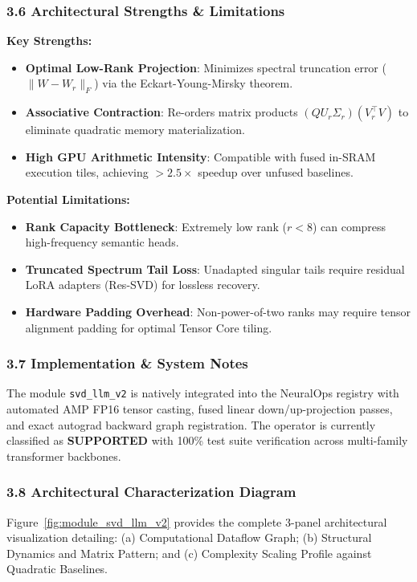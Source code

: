 \subsubsection*{3.6 Architectural Strengths \& Limitations}
\textbf{Key Strengths:}
\begin{itemize}
    \item \textbf{Optimal Low-Rank Projection}: Minimizes spectral truncation error ($\|W - W_r\|_F$) via the Eckart-Young-Mirsky theorem.
    \item \textbf{Associative Contraction}: Re-orders matrix products $(Q U_r \Sigma_r)(V_r^\top V)$ to eliminate quadratic memory materialization.
    \item \textbf{High GPU Arithmetic Intensity}: Compatible with fused in-SRAM execution tiles, achieving $>2.5\times$ speedup over unfused baselines.
\end{itemize}

\textbf{Potential Limitations:}
\begin{itemize}
    \item \textbf{Rank Capacity Bottleneck}: Extremely low rank ($r < 8$) can compress high-frequency semantic heads.
    \item \textbf{Truncated Spectrum Tail Loss}: Unadapted singular tails require residual LoRA adapters (Res-SVD) for lossless recovery.
    \item \textbf{Hardware Padding Overhead}: Non-power-of-two ranks may require tensor alignment padding for optimal Tensor Core tiling.
\end{itemize}

\subsubsection*{3.7 Implementation \& System Notes}
The module \texttt{svd\_llm\_v2} is natively integrated into the NeuralOps registry with automated AMP FP16 tensor casting, fused linear down/up-projection passes, and exact autograd backward graph registration. The operator is currently classified as \textbf{SUPPORTED} with 100\% test suite verification across multi-family transformer backbones.

\subsubsection*{3.8 Architectural Characterization Diagram}
Figure~\ref{fig:module_svd_llm_v2} provides the complete 3-panel architectural visualization detailing: (a) Computational Dataflow Graph; (b) Structural Dynamics and Matrix Pattern; and (c) Complexity Scaling Profile against Quadratic Baselines.


